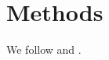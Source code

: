 \section{Methods}
We follow \cite{missing2023} and \cites{eta2016}{theta2015}.
\nocite{iota2014}
\citeauthor{Alpha2020}

